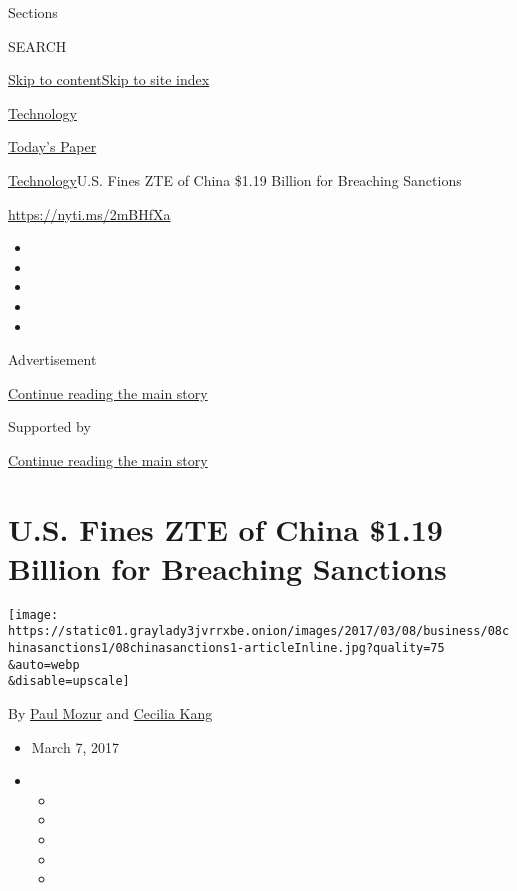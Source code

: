 Sections

SEARCH

\protect\hyperlink{site-content}{Skip to
content}\protect\hyperlink{site-index}{Skip to site index}

\href{https://www.nytimes3xbfgragh.onion/section/technology}{Technology}

\href{https://myaccount.nytimes3xbfgragh.onion/auth/login?response_type=cookie\&client_id=vi}{}

\href{https://www.nytimes3xbfgragh.onion/section/todayspaper}{Today's
Paper}

\href{/section/technology}{Technology}\textbar{}U.S. Fines ZTE of China
\$1.19 Billion for Breaching Sanctions

\url{https://nyti.ms/2mBHfXa}

\begin{itemize}
\item
\item
\item
\item
\item
\end{itemize}

Advertisement

\protect\hyperlink{after-top}{Continue reading the main story}

Supported by

\protect\hyperlink{after-sponsor}{Continue reading the main story}

\hypertarget{us-fines-zte-of-china-119-billion-for-breaching-sanctions}{%
\section{U.S. Fines ZTE of China \$1.19 Billion for Breaching
Sanctions}\label{us-fines-zte-of-china-119-billion-for-breaching-sanctions}}

\texttt{[image: https://static01.graylady3jvrrxbe.onion/images/2017/03/08/business/08chinasanctions1/08chinasanctions1-articleInline.jpg?quality=75\\\&auto=webp\\\&disable=upscale]}

By \href{https://www.nytimes3xbfgragh.onion/by/paul-mozur}{Paul Mozur}
and \href{http://www.nytimes3xbfgragh.onion/by/cecilia-kang}{Cecilia
Kang}

\begin{itemize}
\item
  March 7, 2017
\item
  \begin{itemize}
  \item
  \item
  \item
  \item
  \item
  \end{itemize}
\end{itemize}

